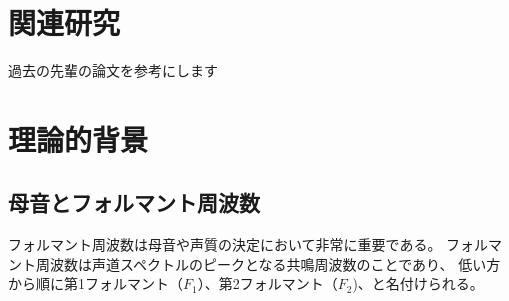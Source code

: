 \documentclass[10ptj,a4j,dvipdfmx,uplatex, oneside, openany]{jsbook}%
\begin{document}

\chapter{関連研究}
過去の先輩の論文を参考にします


\chapter{理論的背景}
\section{母音とフォルマント周波数}
フォルマント周波数は母音や声質の決定において非常に重要である。
フォルマント周波数は声道スペクトルのピークとなる共鳴周波数のことであり、
低い方から順に第1フォルマント（$F_1$）、第2フォルマント（$F_2$)、と名付けられる。
\end{document}
